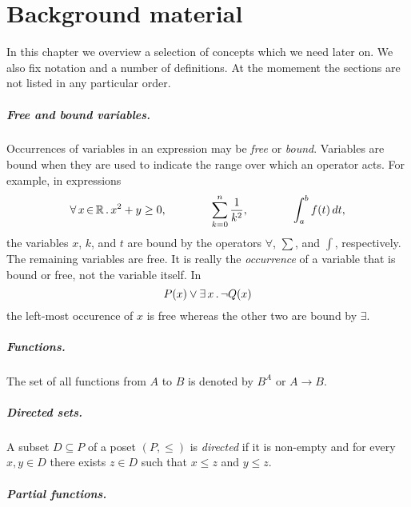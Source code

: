 \chapter{Background material}
\label{chap:background-material}

In this chapter we overview a selection of concepts which we need
later on. We also fix notation and a number of definitions. At the
momement the sections are not listed in any particular order.

\paragraph{Free and bound variables.}

Occurrences of variables in an expression may be \emph{free} or
\emph{bound}. Variables are bound when they are used to indicate the
range over which an operator acts. For example, in expressions
%
\begin{equation*}
  \forall\, x \,{\in}\, \mathbb{R}\,.\,x^2 + y \geq 0,
  \qquad\qquad
  \sum_{k = 0}^n \frac{1}{k^2},
  \qquad\qquad
  \int_a^b f(t) \, dt,
\end{equation*}
%
the variables $x$, $k$, and $t$ are bound by the operators $\forall$,
$\sum$, and $\int$, respectively. The remaining variables are free. It
is really the \emph{occurrence} of a variable that is bound or free,
not the variable itself. In
%
\begin{equation*}
  P(x) \lor \exists\, x\,.\,\lnot Q(x)
\end{equation*}
%
the left-most occurence of $x$ is free whereas the other two are bound
by $\exists$.

\paragraph{Functions.}

The set of all functions from $A$ to $B$ is denoted by $B^A$ or $A \to B$.

\paragraph{Directed sets.}

A subset $D \subseteq P$ of a poset $(P, {\leq})$ is \emph{directed}
if it is non-empty and for every $x, y \in D$ there exists $z \in D$
such that $x \leq z$ and $y \leq z$.


\paragraph{Partial functions.}

